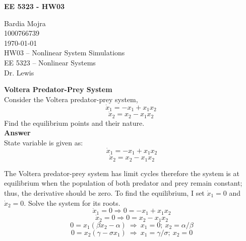 \documentclass{homeworg}
\begin{document}
\begin{center}
\textbf{EE 5323 - HW03}\\
\end{center}

\noindent
Bardia Mojra\\
1000766739\\
\today\\
HW03 -- Nonlinear System Simulations\\
EE 5323 -- Nonlinear Systems\\
Dr. Lewis

\exercise
\noindent
\textbf{Voltera Predator-Prey System} \\
Consider the Voltera predator-prey system,\\
\begin{equation*}
\dot{x}_1 = - x_1 + x_1 x_2
\end{equation*}
\begin{equation*}
\dot{x}_2 = x_2 -  x_1 x_2
\end{equation*}
Find the equilibrium points and their nature.\\

\noindent
\textbf{Answer} \\
State variable is given as:
\begin{equation*}
~\dot{x}_1 = - x_1 + x_1 x_2
\end{equation*}
\begin{equation*}
~\dot{x}_2 = x_2 -  x_1 x_2
\end{equation*}

The Voltera predator-prey system has limit cycles therefore the system is
at equilibrium when the population of both predator and prey remain
constant; thus, the derivative should be zero.
To find the equilibrium, I set $\dot{x}_{1}=0$ and $\dot{x}_{2}=0$.
Solve the system for its roots.\\

\begin{equation*}
~\dot{x}_1 = 0 \Rightarrow 0 =  - x_1 + x_1 x_2
\end{equation*}
\begin{equation*}
~\dot{x}_2 = 0 \Rightarrow 0 = x_2 -  x_1 x_2
\end{equation*}
\begin{equation*}
~0 = x_1 (\beta x_2 - \alpha)~\Rightarrow~x_1 = 0 ; ~x_2 = \alpha/\beta
\end{equation*}
\begin{equation*}
  ~0 = x_2 (\gamma - \sigma x_1)~\Rightarrow~x_1 = \gamma/\sigma ; ~x_2 = 0
\end{equation*}
\end{document}
